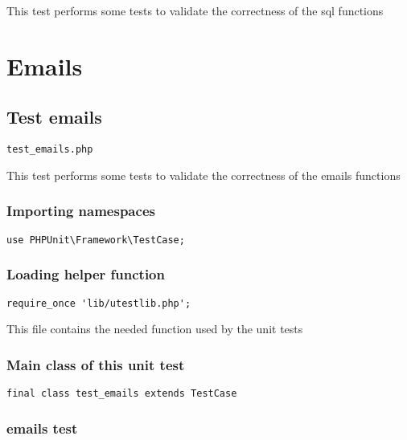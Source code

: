 \documentclass[a4paper]{article}
\begin{document}
This test performs some tests to validate the correctness
of the sql functions


\hypertarget{toc152}{}
\section{Emails}

\hypertarget{toc153}{}
\subsection{Test emails}

\begin{lstlisting}
test_emails.php
\end{lstlisting}

This test performs some tests to validate the correctness
of the emails functions

\hypertarget{toc154}{}
\subsubsection{Importing namespaces}

\begin{lstlisting}
use PHPUnit\Framework\TestCase;
\end{lstlisting}

\hypertarget{toc155}{}
\subsubsection{Loading helper function}

\begin{lstlisting}
require_once 'lib/utestlib.php';
\end{lstlisting}

This file contains the needed function used by the unit tests

\hypertarget{toc156}{}
\subsubsection{Main class of this unit test}

\begin{lstlisting}
final class test_emails extends TestCase
\end{lstlisting}

\hypertarget{toc157}{}
\subsubsection{emails test}
\end{document}
